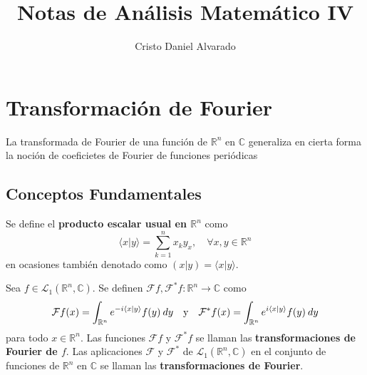 \documentclass[12pt]{report}
\theoremstyle{largebreak}
\newcommand\cf[3]{\ensuremath{#1:#2\rightarrow#3}}
\newcommand\pint[2]{\ensuremath{\langle#1| #2\rangle}}
\begin{document}
    \setlength{\parskip}{5pt} %
    \setlength{\parindent}{12pt} %
    \title{Notas de Análisis Matemático IV}
    \author{Cristo Daniel Alvarado}
    \maketitle

    \tableofcontents %

    
    \chapter{Transformación de Fourier}
    
    La transformada de Fourier de una función de $\mathbb{R}^n$ en $\mathbb{C}$ generaliza en cierta forma la noción de coeficietes de Fourier de funciones periódicas
    
    \section{Conceptos Fundamentales}

    \begin{mydef}
        Se define el \textbf{producto escalar usual en $\mathbb{R}^n$} como
        \begin{equation*}
            \pint{x}{y}=\sum_{ k=1}^n x_ky_x,\quad\forall x,y\in\mathbb{R}^n
        \end{equation*}
        en ocasiones también denotado como $(x|y)=\pint{x}{y}$.
    \end{mydef}

    \begin{mydef}
        Sea $f\in\mathcal{L}_1(\mathbb{R}^n,\mathbb{C})$. Se definen $\cf{\mathcal{F}f,\mathcal{F}^*f}{\mathbb{R}^n}{\mathbb{C}} $ como
        \begin{equation*}
            \mathcal{F}f(x)=\int_{ \mathbb{R}^n}e^{ -i\pint{x}{y}}f(y)\:dy\quad\textup{y}\quad\mathcal{F}^*f(x)=\int_{ \mathbb{R}^n}e^{i\pint{x}{y}}f(y)\:dy
        \end{equation*}
        para todo $x\in\mathbb{R}^n$. Las funciones $\mathcal{F}f$ y $\mathcal{F}^*f$ se llaman las \textbf{transformaciones de Fourier de $f$}. Las aplicaciones $\mathcal{F}$ y $\mathcal{F}^*$ de $\mathcal{L}_1(\mathbb{R}^n,\mathbb{C})$ en el conjunto de funciones de $\mathbb{R}^n$ en $\mathbb{C}$ se llaman las \textbf{transformaciones de Fourier}.
    \end{mydef}
\end{document}
